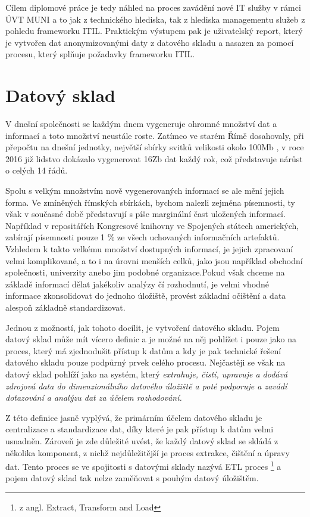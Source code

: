 \documentclass[
  digital,     %
  twoside,     %
  lof,         %
  lot,         %
]{fithesis4}
\begin{document}
Cílem diplomové práce je tedy náhled na proces zavádění nové IT služby v rámci ÚVT MUNI a to jak z technického hlediska, tak z hlediska managementu služeb z pohledu frameworku ITIL. Praktickým výstupem pak je uživatelský report, který je vytvořen dat anonymizovanými daty z datového skladu a nasazen za pomocí procesu, který splňuje požadavky frameworku ITIL.
\chapter{Datový sklad}

V dnešní společnosti se každým dnem vygeneruje ohromné množství dat a informací a
toto množství neustále roste. Zatímco ve starém Římě dosahovaly, při přepočtu na dnešní
jednotky, největší sbírky svitků velikosti okolo 100Mb \parencite[p.~157]{Smil2021}, v roce 2016 již
lidstvo dokázalo vygenerovat 16Zb dat každý rok\parencite[p.~160]{Smil2021}, což představuje nárůst
o celých 14 řádů.

Spolu s velkým množstvím nově vygenerovaných informací se ale mění jejich
forma. Ve zmíněných římských sbírkách, bychom nalezli zejména písemnosti, ty však v současné době představují s
píše marginální čast uložených informací. Například v repositářích Kongresové knihovny ve Spojených státech amerických, zabírají písemnosti
pouze 1 \% ze všech uchovaných informačních artefaktů. \parencite[p.~158]{Smil2021}
Vzhledem k takto velkému množství dostupných informací, je jejich zpracovaní velmi
komplikované, a to i na úrovni menších celků, jako jsou například obchodní společnosti, univerzity
anebo jim podobné organizace.Pokud však chceme na základě informací dělat jakékoliv analýzy čí rozhodnutí, je velmi vhodné informace zkonsolidovat do jednoho úložiště,
provést základní očištění a data alespoň základně standardizovat.

Jednou z možností, jak tohoto docílit, je vytvoření datového skladu. Pojem datový
sklad může mít vícero definic a je možné na něj pohlížet i pouze jako na proces, který má
zjednodušit přístup k datům a kdy je pak technické řešení datového skladu pouze podpůrný prvek celého procesu.
Nejčastěji se však na datový sklad pohlíží jako na systém, který \emph{extrahuje, čistí, upravuje a dodává zdrojová data do dimenzionálního
datového úložiště a poté podporuje a zavádí dotazování a analýzu dat za účelem
rozhodování.} \parencite[s.~23]{Kimballc2004}

Z této definice jasně vyplývá, že primárním účelem datového skladu je centralizace a
standardizace dat, díky které je pak přístup k datům velmi usnadněn. Zároveň je zde důležité
uvést, že každý datový sklad se skládá z několika komponent, z nichž nejdůležitější je proces
extrakce, čištění a úpravy dat. Tento proces se ve spojitosti s datovými sklady nazývá ETL
proces \footnote{z angl. Extract, Transform and Load} a pojem datový sklad tak nelze zaměňovat
s pouhým datový úložištěm. \parencite[s.~24]{Kimballc2004}
\end{document}

